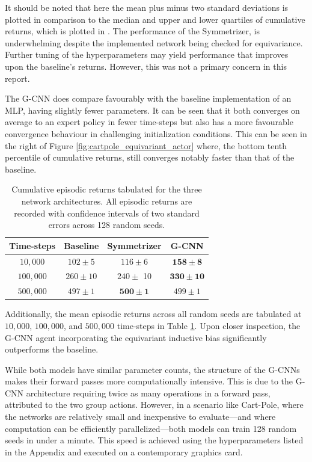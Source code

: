 It should be noted that here the mean plus minus two standard deviations is plotted in comparison to the median and upper and lower quartiles of cumulative returns, which is plotted in \cite{vanderpol2020mdp}. The performance of the Symmetrizer, is underwhelming despite the implemented network being checked for equivariance. Further tuning of the hyperparameters may yield performance that improves upon the baseline's returns. However, this was not a primary concern in this report.

The G-CNN does compare favourably with the baseline implementation of an MLP, having slightly fewer parameters. It can be seen that it both converges on average to an expert policy in fewer time-steps but also has a more favourable convergence behaviour in challenging initialization conditions. This can be seen in the right of Figure \ref{fig:cartpole_equivariant_actor} where, the bottom tenth percentile of cumulative returns, still converges notably faster than that of the baseline.

\begin{table}
	\centering
	\begin{tabular}{|c|c|c|c|}
		\hline
		Time-steps & Baseline     & Symmetrizer          & G-CNN                 \\
		\hline
		$10, 000$  & $102 \pm 5$  & $116 \pm 6$          & $\mathbf{158 \pm 8}$  \\
		$100, 000$ & $260 \pm 10$ & $240 \pm$ 10         & $\mathbf{330 \pm 10}$ \\
		$500,000$  & $497 \pm 1$  & $\mathbf{500 \pm 1}$ & $499 \pm 1$           \\
		\hline
	\end{tabular}
	\caption{Cumulative episodic returns tabulated for the three network architectures. All episodic returns are recorded with confidence intervals of two standard errors across 128 random seeds.}
	\label{tab:actor-critic}
\end{table}
Additionally, the mean episodic returns across all random seeds are tabulated at $10,000$, $100,000$, and $500,000$ time-steps in Table \ref{tab:actor-critic}. Upon closer inspection, the G-CNN agent incorporating the equivariant inductive bias significantly outperforms the baseline.

While both models have similar parameter counts, the structure of the G-CNNs makes their forward passes more computationally intensive. This is due to the G-CNN architecture requiring twice as many operations in a forward pass, attributed to the two group actions. However, in a scenario like Cart-Pole, where the networks are relatively small and inexpensive to evaluate—and where computation can be efficiently parallelized—both models can train 128 random seeds in under a minute. This speed is achieved using the hyperparameters listed in the Appendix and executed on a contemporary graphics card.

